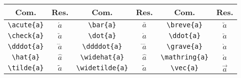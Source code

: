 % 
% 
% 
% 
% 
\begin{tabular}{cc|cc|cc}
    \hline
    Com. & Res. & Com. & Res. & Com. & Res. \\ \hline
    \lstinline!\acute{a}! & $\acute{a}$ & \lstinline!\bar{a}! & $\bar{a}$ & \lstinline!\breve{a}! & $\breve{a}$ \\
    \lstinline!\check{a}! & $\check{a}$ & \lstinline!\dot{a}! & $\dot{a}$ & \lstinline!\ddot{a}! & $\ddot{a}$ \\
    \lstinline!\dddot{a}! & $\dddot{a}$ & \lstinline!\ddddot{a}! & $\ddddot{a}$ & \lstinline!\grave{a}! & $\grave{a}$ \\
    \lstinline!\hat{a}! & $\hat{a}$ & \lstinline!\widehat{a}! & $\widehat{a}$ & \lstinline!\mathring{a}! & $\mathring{a}$ \\
    \lstinline!\tilde{a}! & $\tilde{a}$ & \lstinline!\widetilde{a}! & $\widetilde{a}$ & \lstinline!\vec{a}! & $\vec{a}$ \hfill
\end{tabular}
